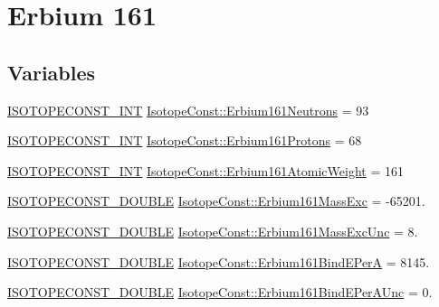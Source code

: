 \hypertarget{group___isotope_const-_erbium-_er161}{}\section{Erbium 161}
\label{group___isotope_const-_erbium-_er161}
\subsection*{Variables}
\begin{DoxyCompactItemize}
\item 
\mbox{\hyperlink{group___isotope_const-_macros_ga5f18360b3e99483a35c32d789e62621c}{I\+S\+O\+T\+O\+P\+E\+C\+O\+N\+S\+T\+\_\+\+I\+NT}} \mbox{\hyperlink{group___isotope_const-_erbium-_er161_ga60e0674458983f070af301c29928fb32}{Isotope\+Const\+::\+Erbium161\+Neutrons}} = 93
\item 
\mbox{\hyperlink{group___isotope_const-_macros_ga5f18360b3e99483a35c32d789e62621c}{I\+S\+O\+T\+O\+P\+E\+C\+O\+N\+S\+T\+\_\+\+I\+NT}} \mbox{\hyperlink{group___isotope_const-_erbium-_er161_ga18b55614d4e9894d2484a3353013e34c}{Isotope\+Const\+::\+Erbium161\+Protons}} = 68
\item 
\mbox{\hyperlink{group___isotope_const-_macros_ga5f18360b3e99483a35c32d789e62621c}{I\+S\+O\+T\+O\+P\+E\+C\+O\+N\+S\+T\+\_\+\+I\+NT}} \mbox{\hyperlink{group___isotope_const-_erbium-_er161_gab73a112ddda865fe17745607a7eeac86}{Isotope\+Const\+::\+Erbium161\+Atomic\+Weight}} = 161
\item 
\mbox{\hyperlink{group___isotope_const-_macros_ga8f45a7272ce02c0b4c65c44636ed719a}{I\+S\+O\+T\+O\+P\+E\+C\+O\+N\+S\+T\+\_\+\+D\+O\+U\+B\+LE}} \mbox{\hyperlink{group___isotope_const-_erbium-_er161_gabd956b264c91f091bef02d42ef27622b}{Isotope\+Const\+::\+Erbium161\+Mass\+Exc}} = -\/65201.
\item 
\mbox{\hyperlink{group___isotope_const-_macros_ga8f45a7272ce02c0b4c65c44636ed719a}{I\+S\+O\+T\+O\+P\+E\+C\+O\+N\+S\+T\+\_\+\+D\+O\+U\+B\+LE}} \mbox{\hyperlink{group___isotope_const-_erbium-_er161_ga7a9424e491e2579a77b0e82641e6c16c}{Isotope\+Const\+::\+Erbium161\+Mass\+Exc\+Unc}} = 8.
\item 
\mbox{\hyperlink{group___isotope_const-_macros_ga8f45a7272ce02c0b4c65c44636ed719a}{I\+S\+O\+T\+O\+P\+E\+C\+O\+N\+S\+T\+\_\+\+D\+O\+U\+B\+LE}} \mbox{\hyperlink{group___isotope_const-_erbium-_er161_gac9d29e58be517a6d5dc247ef7f14edd3}{Isotope\+Const\+::\+Erbium161\+Bind\+E\+PerA}} = 8145.
\item 
\mbox{\hyperlink{group___isotope_const-_macros_ga8f45a7272ce02c0b4c65c44636ed719a}{I\+S\+O\+T\+O\+P\+E\+C\+O\+N\+S\+T\+\_\+\+D\+O\+U\+B\+LE}} \mbox{\hyperlink{group___isotope_const-_erbium-_er161_ga12dd4f008524a7c821389215ed3f572b}{Isotope\+Const\+::\+Erbium161\+Bind\+E\+Per\+A\+Unc}} = 0.

\end{DoxyCompactItemize}
